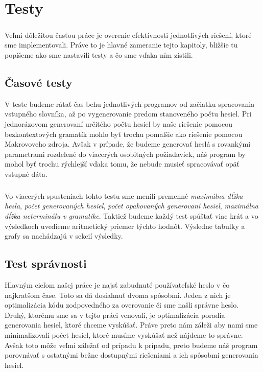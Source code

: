 \chapter{Testy}

\paragraph{}
Veľmi dôležitou časťou práce je overenie efektívnosti jednotlivých riešení, ktoré sme implementovali. Práve to je hlavné zameranie tejto kapitoly, bližšie tu popíšeme ako sme nastavili testy a čo sme vďaka ním zistili.

\section{Časové testy}
V teste budeme rátať čas behu jednotlivých programov od začiatku spracovania vstupného slovníka, až po vygenerovanie predom stanoveného počtu hesiel. Pri jednorázovom generovaní určitého počtu hesiel by naše riešenie pomocou bezkontextových gramatík mohlo byť trochu pomalšie ako riešenie pomocou Makrovoveho zdroja. Avšak v prípade, že budeme generovať heslá s rovankými parametrami rozdelené do viacerých osobitných požiadaviek, náš program by mohol byť trochu rýchlejší vďaka tomu, že nebude musieť spracovávať opäť vstupné dáta. 

\paragraph{}
Vo viacerých spusteniach tohto testu sme menili premenné \emph{maximálna dĺžka hesla}, \emph{počet generovaných hesiel}, \emph{počet opakovaných generovaní hesiel}, \emph{maximálna dĺžka neterminálu v gramatike}. Taktiež budeme každý test spúštať viac krát a vo výsledkoch uvedieme aritmetický priemer týchto hodnôt. Výsledne tabuľky a grafy sa nachádzajú v sekcií výsledky.

\section{Test správnosti}
Hlavným cieľom našej práce je najsť zabudnuté používateľské heslo v čo najkratšom čase. Toto sa dá dosiahnuť dvoma spôsobmi. Jeden z nich je optimalizácia kódu zodpovedného za overovanie či sme našli správne heslo. Druhý, ktorému sme sa v tejto práci venovali, je optimalizácia poradia generovania hesiel, ktoré chceme vyskúšať. Práve preto nám záleži aby nami sme minimalizovali počet hesiel, ktoré musíme vyskúšať než nájdeme to správne. Avšak toto môže veľmi záležať od prípadu k prípadu, preto budeme náš program porovnávať s ostatnými bežne dostupnými riešeniami a ich spôsobmi generovania hesiel. 

